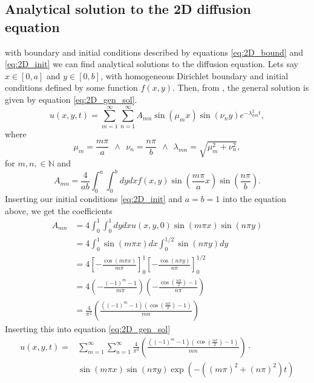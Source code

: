 \documentclass[reprint, english,notitlepage,nofootinbib]{revtex4-1}  %
\begin{document}
\subsection*{Analytical solution to the 2D diffusion equation}
with boundary and initial conditions described by equations \eqref{eq:2D_bound} and \eqref{eq:2D_init} we can find analytical solutions to the diffusion equation. Lets say $x\in[0,a]$ and $y\in[0,b]$, with homogeneous Dirichlet boundary and initial conditions defined by some function $f(x,y)$. Then, from \cite{2D_diffusion}, the general solution is given by equation \eqref{eq:2D_gen_sol}.
\begin{equation}
	\label{eq:2D_gen_sol}
	u(x,y,t) = \sum_{m=1}^{\infty}\sum_{n=1}^{\infty}A_{mn}\sin(\mu_m x)\sin(\nu_n y)e^{-\lambda^2_{mn}t},
\end{equation}
where
\begin{equation*}
	\mu_m = \frac{m\pi}{a} \ \ \wedge \ \ \nu_n=\frac{n\pi}{b} \ \ \wedge \ \ \lambda_{mn} = \sqrt{\mu_m^2 + \nu_n^2},
\end{equation*}
for $m,n,\in\mathbb{N}$ and
\begin{equation*}
	A_{mn} = \frac{4}{ab}\int_{0}^{a}\int_{0}^{b}dydxf(x,y)\sin(\frac{m\pi}{a}x)\sin(\frac{n\pi}{b}).
\end{equation*}
Inserting our initial conditions \eqref{eq:2D_init} and $a=b=1$ into the equation above, we get the coefficients
\begin{align*}
	A_{mn} &= 4\int_{0}^{1}\int_{0}^{1}dydxu(x,y,0)\sin(m\pi x)\sin(n\pi y) \\
	&= 4\int_{0}^{1}\sin(m\pi x)dx \int_{0}^{1/2}\sin(n\pi y)dy \\
	&= 4\left[-\frac{\cos(m\pi x)}{m\pi}\right]_0^1\left[-\frac{\cos(n\pi y)}{n\pi}\right]_0^{1/2} \\
	&= 4\left(-\frac{(-1)^{m} - 1}{m\pi}\right)\left(-\frac{\cos(\frac{n\pi}{2}) - 1}{n\pi}\right) \\
	&= \frac{4}{\pi^2}\left(\frac{\left((-1)^m - 1\right)\left(\cos(\frac{n\pi}{2}) - 1\right)}{mn}\right)
\end{align*}
Inserting this into equation \eqref{eq:2D_gen_sol}
\begin{align*}
	u(x,y,t) =& \sum_{m=1}^{\infty}\sum_{n=1}^{\infty}\frac{4}{\pi^2}\left(\frac{\left((-1)^m - 1\right)\left(\cos(\frac{n\pi}{2}) - 1\right)}{mn}\right)\cdot\\
	&\sin(m\pi x)\sin(n\pi y)\exp(-((m\pi)^2 + (n\pi)^2)t)
\end{align*}
\end{document}
